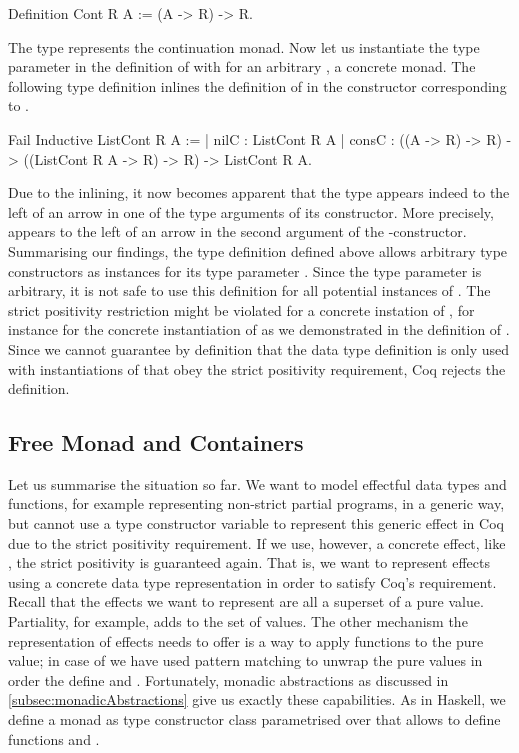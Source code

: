 \begin{coqcode}
Definition Cont R A := (A -> R) -> R.
\end{coqcode}

The type  represents the continuation monad.
Now let us instantiate the type parameter  in the definition of  with  for an arbitrary , a concrete monad.
The following type definition  inlines the definition of  in the constructor corresponding to .

\begin{coqcode}
Fail Inductive ListCont R A :=
| nilC  : ListCont R A
| consC : ((A -> R) -> R) -> ((ListCont R A -> R) -> R) -> ListCont R A.
\end{coqcode}

Due to the inlining, it now becomes apparent that the type  appears indeed to the left of an arrow in one of the type arguments of its constructor.
More precisely,  appears to the left of an arrow in the second argument of the \--constructor.
Summarising our findings, the type definition  defined above allows arbitrary type constructors as instances for its type parameter .
Since the type parameter is arbitrary, it is not safe to use this definition for all potential instances of .
The strict positivity restriction might be violated for a concrete instation of , for instance for the concrete instantiation of  as we demonstrated in the definition of .
Since we cannot guarantee by definition that the data type definition  is only used with instantiations of  that obey the strict positivity requirement, Coq rejects the definition.

\subsection{Free Monad and Containers}
\label{subsec:freeAndContainers}

Let us summarise the situation so far.
We want to model effectful data types and functions, for example representing non\--strict partial programs, in a generic way, but cannot use a type constructor variable to represent this generic effect in Coq due to the strict positivity requirement.
If we use, however, a concrete effect, like , the strict positivity is guaranteed again.
That is, we want to represent effects using a concrete data type representation in order to satisfy Coq's requirement.
Recall that the effects we want to represent are all a superset of a pure value.
Partiality, for example, adds  to the set of  values.
The other mechanism the representation of effects needs to offer is a way to apply functions to the pure value; in case of  we have used pattern matching to unwrap the pure values in order the define  and .
Fortunately, monadic abstractions as discussed in \autoref{subsec:monadicAbstractions} give us exactly these capabilities.
As in Haskell, we define a monad as type constructor class parametrised over  that allows to define functions  and .

